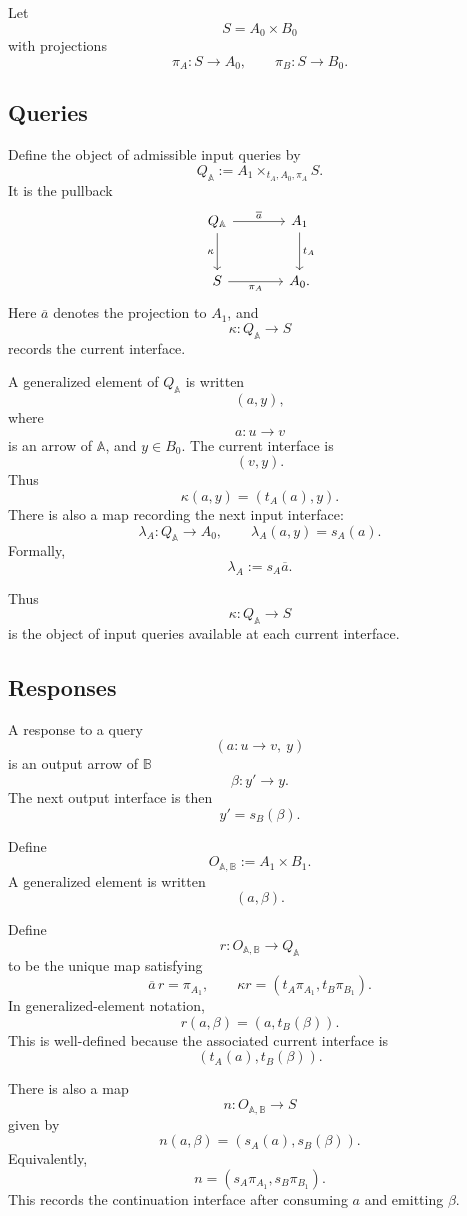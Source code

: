 Let
\[
S=A_0\times B_0
\]
with projections
\[
\pi_A:S\to A_0,
\qquad
\pi_B:S\to B_0.
\]

\subsection{Queries}

Define the object of admissible input queries by
\[
Q_{\mathbb A}:=
A_1\times_{t_A,A_0,\pi_A}S.
\]
It is the pullback
\[
\begin{tikzcd}[column sep=large,row sep=large]
Q_{\mathbb A}
  \arrow[r, "\overline a"]
  \arrow[d, "\kappa"']
&
A_1
  \arrow[d, "t_A"]
\\
S
  \arrow[r, "\pi_A"']
&
A_0 .
\end{tikzcd}
\]
Here \(\overline a\) denotes the projection to \(A_1\), and
\[
\kappa:Q_{\mathbb A}\to S
\]
records the current interface.

A generalized element of \(Q_{\mathbb A}\) is written
\[
(a,y),
\]
where
\[
a:u\to v
\]
is an arrow of \(\mathbb A\), and \(y\in B_0\). The current interface is
\[
(v,y).
\]
Thus
\[
\kappa(a,y)=(t_A(a),y).
\]
There is also a map recording the next input interface:
\[
\lambda_A:Q_{\mathbb A}\to A_0,
\qquad
\lambda_A(a,y)=s_A(a).
\]
Formally,
\[
\lambda_A:=s_A\overline a.
\]

Thus
\[
\kappa:Q_{\mathbb A}\to S
\]
is the object of input queries available at each current interface.

\subsection{Responses}

A response to a query
\[
(a:u\to v,\ y)
\]
is an output arrow of \(\mathbb B\)
\[
\beta:y'\to y.
\]
The next output interface is then
\[
y'=s_B(\beta).
\]

Define
\[
O_{\mathbb A,\mathbb B}:=A_1\times B_1.
\]
A generalized element is written
\[
(a,\beta).
\]

Define
\[
r:O_{\mathbb A,\mathbb B}\to Q_{\mathbb A}
\]
to be the unique map satisfying
\[
\overline a\,r=\pi_{A_1},
\qquad
\kappa r=(t_A\pi_{A_1},t_B\pi_{B_1}).
\]
In generalized-element notation,
\[
r(a,\beta)=(a,t_B(\beta)).
\]
This is well-defined because the associated current interface is
\[
(t_A(a),t_B(\beta)).
\]

There is also a map
\[
n:O_{\mathbb A,\mathbb B}\to S
\]
given by
\[
n(a,\beta)=(s_A(a),s_B(\beta)).
\]
Equivalently,
\[
n=(s_A\pi_{A_1},s_B\pi_{B_1}).
\]
This records the continuation interface after consuming \(a\) and emitting
\(\beta\).

